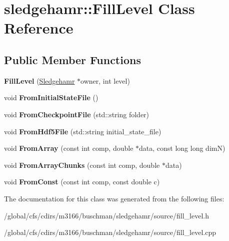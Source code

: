 \hypertarget{classsledgehamr_1_1FillLevel}{}\section{sledgehamr\+:\+:Fill\+Level Class Reference}
\label{classsledgehamr_1_1FillLevel}
\subsection*{Public Member Functions}
\begin{DoxyCompactItemize}
\item 
\mbox{\label{classsledgehamr_1_1FillLevel_a15e50c8e83fb02a3e7cfadf75d798c39}} 
{\bfseries Fill\+Level} (\mbox{\hyperlink{classsledgehamr_1_1Sledgehamr}{Sledgehamr}} $\ast$owner, int level)
\item 
\mbox{\label{classsledgehamr_1_1FillLevel_a32272a06c4a4238f47b008220a449f87}} 
void {\bfseries From\+Initial\+State\+File} ()
\item 
\mbox{\label{classsledgehamr_1_1FillLevel_ad7a535ae81fe6b4b3160fabee939294e}} 
void {\bfseries From\+Checkpoint\+File} (std\+::string folder)
\item 
\mbox{\label{classsledgehamr_1_1FillLevel_a204b7748191f00332384512697e2bc83}} 
void {\bfseries From\+Hdf5\+File} (std\+::string initial\+\_\+state\+\_\+file)
\item 
\mbox{\label{classsledgehamr_1_1FillLevel_a47fcd3db3a286f70836366d0c1bb0274}} 
void {\bfseries From\+Array} (const int comp, double $\ast$data, const long long dimN)
\item 
\mbox{\label{classsledgehamr_1_1FillLevel_a422d6c8e962409de45ace3bfb3b41b7d}} 
void {\bfseries From\+Array\+Chunks} (const int comp, double $\ast$data)
\item 
\mbox{\label{classsledgehamr_1_1FillLevel_a0cae844e7fe47a7bef70925b34ee436e}} 
void {\bfseries From\+Const} (const int comp, const double c)
\end{DoxyCompactItemize}


The documentation for this class was generated from the following files\+:\begin{DoxyCompactItemize}
\item 
/global/cfs/cdirs/m3166/buschman/sledgehamr/source/fill\+\_\+level.\+h\item 
/global/cfs/cdirs/m3166/buschman/sledgehamr/source/fill\+\_\+level.\+cpp\end{DoxyCompactItemize}
